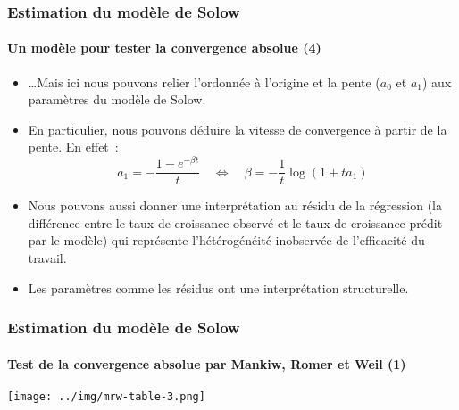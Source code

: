 \documentclass[10pt,notheorems]{beamer}
\theoremstyle{plain}
\theoremstyle{definition} %
\begin{document}
\begin{frame}
  \frametitle{Estimation du modèle de Solow}
  \framesubtitle{Un modèle pour tester la convergence absolue (4)}

  \begin{itemize}

  \item \ldots Mais ici nous pouvons relier l'ordonnée à l'origine et la pente ($a_0$ et $a_1$) aux paramètres du modèle de Solow.\newline

  \item En particulier, nous pouvons déduire la vitesse de convergence à partir de la pente. En effet~:
    \[
      a_1 = -\frac{1-e^{-\beta t}}{t} \quad\Leftrightarrow\quad \beta = -\frac{1}{t}\log\left(1+ta_1\right)
    \]

    \medskip

  \item Nous pouvons aussi donner une interprétation au résidu de la régression (la différence entre le taux de croissance observé et le taux de croissance prédit par le modèle) qui représente l'hétérogénéité inobservée de l'efficacité du travail.\newline

  \item Les paramètres comme les résidus ont une interprétation structurelle.

  \end{itemize}


\end{frame}


\begin{frame}
  \frametitle{Estimation du modèle de Solow}
  \framesubtitle{Test de la convergence absolue par Mankiw, Romer et Weil (1)}

  \begin{center}
    \texttt{[image: ../img/mrw-table-3.png]}
  \end{center}


\end{frame}
\end{document}

